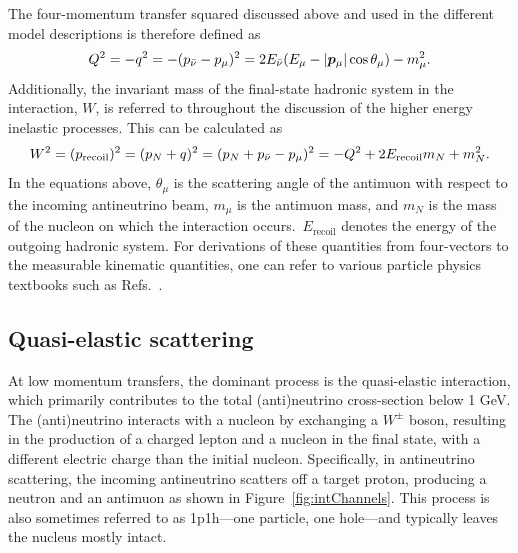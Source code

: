The four-momentum transfer squared discussed above and used in the different model descriptions is therefore defined as
\vspace{-10pt}
\begin{equation}
    Q^2 = -q^2 = -(p_{\bar{\nu}}-p_\mu)^2 = 2E_{\bar{\nu}} (E_\mu - |\bm{p}_\mu| \cos{\theta_{\mu}}) - m^2_\mu \vspace{2pt} .
    \vspace{-10pt}
\end{equation}
Additionally, the invariant mass of the final-state hadronic system in the interaction, $W$, is referred to throughout the discussion of the higher energy inelastic processes. This can be calculated as
\vspace{-10pt}
\begin{equation}
    W^2 = (p_\text{recoil})^2 = (p_N + q)^2 = (p_N+p_{\bar{\nu}}-p_{\mu})^2 = -Q^2 + 2E_{\text{recoil}}m_N + m_N^2 \vspace{2pt} .
    \vspace{-10pt}
\end{equation}
In the equations above, $\theta_{\mu}$ is the scattering angle of the antimuon with respect to the incoming antineutrino beam, $m_{\mu}$ is the antimuon mass, and $m_N$ is the mass of the nucleon on which the interaction occurs.~$E_{\text{recoil}}$ denotes the energy of the outgoing hadronic system. For derivations of these quantities from four-vectors to the measurable kinematic quantities, one can refer to various particle physics textbooks such as Refs.~\cite{Thomson, Griffiths}.
\newpage
\subsection{Quasi-elastic scattering}

At low momentum transfers, the dominant process is the quasi-elastic interaction, which primarily contributes to the total (anti)neutrino cross-section below 1 GeV. The (anti)neu\-trino interacts with a nucleon by exchanging a $W^{\pm}$ boson, resulting in the production of a charged lepton and a nucleon in the final state, with a different electric charge than the initial nucleon. Specifically, in antineutrino scattering, the incoming antineutrino scatters off a target proton, producing a neutron and an antimuon as shown in Figure~\ref{fig:intChannels}. This process is also sometimes referred to as 1p1h---one particle, one hole---and typically leaves the nucleus mostly intact. 

